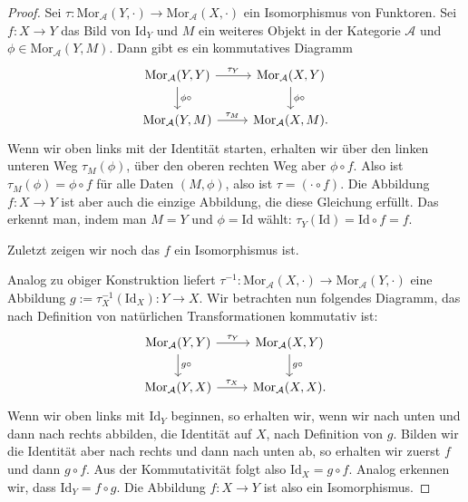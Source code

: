 \documentclass[leqno]{article}
\theoremstyle{plain}
\theoremstyle{definition}
\theoremstyle{remark}
\begin{document}
\begin{proof}
Sei $\tau: \text{Mor}_{\mathcal{A}}(Y,\cdot) \rightarrow \text{Mor}_{\mathcal{A}}(X,\cdot)$ ein Isomorphismus von Funktoren. Sei $f: X \rightarrow Y$ das Bild von $\text{Id}_Y$ und $M$ ein weiteres Objekt in der Kategorie $\mathcal{A}$ und $\phi \in \text{Mor}_\mathcal{A}(Y,M)$. Dann gibt es ein kommutatives Diagramm
\begin{equation}
	\begin{tikzcd}
	{\text{Mor}_{\mathcal{A}}(Y,Y)} \arrow[d, "\phi \circ"] \arrow[r, "\tau_Y"] & {\text{Mor}_{\mathcal{A}}(X,Y)} \arrow[d, "\phi \circ"] \\
	{\text{Mor}_{\mathcal{A}}(Y,M)} \arrow[r, "\tau_M"]                         & {\text{Mor}_{\mathcal{A}}(X,M)}.                        
	\end{tikzcd}
\end{equation}
Wenn wir oben links mit der Identität starten, erhalten wir über den linken unteren Weg $\tau_M(\phi)$, über den oberen rechten Weg aber $\phi \circ f$. Also ist $\tau_M(\phi) = \phi \circ f$ für alle Daten $(M,\phi)$, also ist $\tau = (\cdot \circ f)$. Die Abbildung $f:X \rightarrow Y$ ist aber auch die einzige Abbildung, die diese Gleichung erfüllt. Das erkennt man, indem man $M = Y$ und $\phi = \text{Id}$ wählt: $\tau_Y(\text{Id}) = \text{Id} \circ f = f$.

Zuletzt zeigen wir noch das $f$ ein Isomorphismus ist.

Analog zu obiger Konstruktion liefert $\tau^{-1}: \text{Mor}_{\mathcal{A}}(X,\cdot) \rightarrow \text{Mor}_{\mathcal{A}}(Y,\cdot)$ eine Abbildung $g := \tau^{-1}_X (\text{Id}_X): Y \rightarrow X$. Wir betrachten nun folgendes Diagramm, das nach Definition von natürlichen Transformationen kommutativ ist:
\begin{equation}
	\begin{tikzcd}
	{\text{Mor}_{\mathcal{A}}(Y,Y)} \arrow[d, "g \circ"] \arrow[r, "\tau_Y"] & {\text{Mor}_{\mathcal{A}}(X,Y)} \arrow[d, "g \circ"] \\
	{\text{Mor}_{\mathcal{A}}(Y,X)} \arrow[r, "\tau_X"]                      & {\text{Mor}_{\mathcal{A}}(X,X)}.                     
	\end{tikzcd}
\end{equation}
Wenn wir oben links mit $\text{Id}_Y$ beginnen, so erhalten wir, wenn wir nach unten und dann nach rechts abbilden, die Identität auf $X$, nach Definition von $g$. Bilden wir die Identität aber nach rechts und dann nach unten ab, so erhalten wir zuerst $f$ und dann $g \circ f$. Aus der Kommutativität folgt also $\text{Id}_X = g \circ f$. Analog erkennen wir, dass $\text{Id}_Y = f \circ g$. Die Abbildung $f:X \rightarrow Y$ ist also ein Isomorphismus.
\end{proof}
\end{document}
